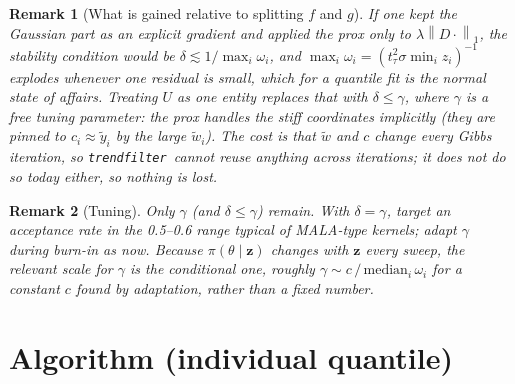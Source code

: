 \documentclass[12pt]{article}
\newcommand{\bz}{\bm{z}}
\newcommand{\norm}[1]{\left\lVert#1\right\rVert}
\newcommand{\tf}{\texttt{trendfilter}}
\newtheorem{remark}{Remark}
\begin{document}
\begin{remark}[What is gained relative to splitting $f$ and $g$]
If one kept the Gaussian part as an explicit gradient and applied the prox only to
$\lambda\norm{D\cdot}_1$, the stability condition would be $\delta\lesssim1/\max_i\omega_i$, and
$\max_i\omega_i=(t_\tau^2\sigma\min_iz_i)^{-1}$ explodes whenever one residual is small,
which for a quantile fit is the normal state of affairs. Treating $U$ as one entity replaces
that with $\delta\le\gamma$, where $\gamma$ is a free tuning parameter: the prox handles the stiff
coordinates implicitly (they are pinned to $c_i\approx\tilde y_i$ by the large $\tilde w_i$).
The cost is that $\tilde w$ and $c$ change every Gibbs iteration, so \tf\ cannot reuse anything
across iterations; it does not do so today either, so nothing is lost.
\end{remark}

\begin{remark}[Tuning]
Only $\gamma$ (and $\delta\le\gamma$) remain. With $\delta=\gamma$, target an acceptance rate in
the 0.5--0.6 range typical of MALA-type kernels; adapt $\gamma$ during burn-in as now. Because
$\pi(\theta\mid\bz)$ changes with $\bz$ every sweep, the relevant scale for $\gamma$ is the
conditional one, roughly $\gamma\sim c\,/\,\mathrm{median}_i\,\omega_i$ for a constant $c$ found by
adaptation, rather than a fixed number.
\end{remark}

\section{Algorithm (individual quantile)}
\end{document}
